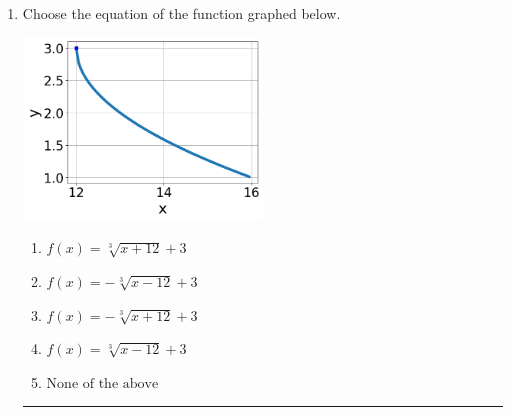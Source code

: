 \documentclass[14pt]{extbook}
\newcommand{\litem}[1]{\item#1\hspace*{-1cm}\rule{\textwidth}{0.4pt}}
\begin{document}
\begin{enumerate}
\litem{
Choose the equation of the function graphed below.
\begin{center}
    \includegraphics[width=0.5\textwidth]{../Figures/radicalGraphToEquationB.png}
\end{center}
\begin{enumerate}[label=\Alph*.]
\item \( f(x) = \sqrt[3]{x + 12} + 3 \)
\item \( f(x) = - \sqrt[3]{x - 12} + 3 \)
\item \( f(x) = - \sqrt[3]{x + 12} + 3 \)
\item \( f(x) = \sqrt[3]{x - 12} + 3 \)
\item \( \text{None of the above} \)


\end{enumerate}}
\end{enumerate}
\end{document}
